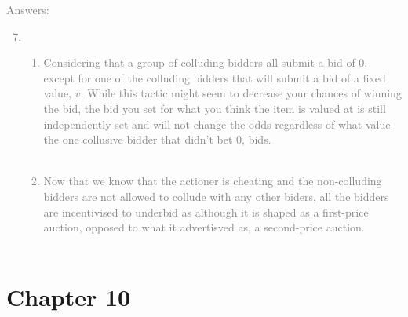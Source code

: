 \documentclass[11pt]{article}
\begin{document}
\textcolor{gray}{
Answers:
\begin{enumerate}
	\setcounter{enumi}{6}
	\item \quad\\
	\begin{enumerate}
		\item  Considering that a group of colluding bidders all submit a bid of 0, except for one of the colluding bidders that will submit a bid of a fixed value, $v$. While this tactic might seem to decrease your chances of winning the bid, the bid you set for what you think the item is valued at  is still independently set and will not change the odds regardless of what value the one collusive bidder that didn't bet 0, bids.   \\\\
		\item Now that we know that the actioner is cheating and the non-colluding bidders are not allowed to collude with any other biders, all the bidders are incentivised to underbid as although it is shaped as a first-price auction, opposed to what it advertisved as, a second-price auction. \\\\
	\end{enumerate}
\end{enumerate}
}

\section*{Chapter 10}
\end{document}

